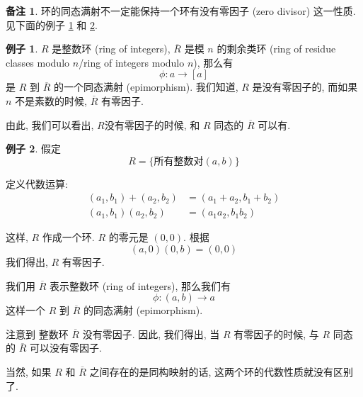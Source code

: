 \documentclass[utf8]{ctexbook}
\theoremstyle{definition}
\newtheorem{memo}{备注}[section]
\newtheorem{example}{例子}[section]
\begin{document}
\begin{memo}
环的同态满射不一定能保持一个环有没有零因子 (zero divisor) 这一性质. 见下面的例子 \ref{example_ring_epi_not_preserving_z_divisor_1} 和 \ref{example_ring_epi_not_preserving_z_divisor_2}.
\end{memo}

\begin{example}\label{example_ring_epi_not_preserving_z_divisor_1}
$R$ 是整数环 (ring of integers), $\overline{R}$ 是模 $n$ 的剩余类环 (ring of residue classes modulo $n$/ring of integers modulo $n$), 那么有
\begin{equation}
\phi: a \rightarrow [a]
\end{equation}
是 $R$ 到 $\overline{R}$ 的一个同态满射 (epimorphism). 我们知道, $R$ 是没有零因子的, 而如果 $n$ 不是素数的时候, $\overline{R}$ 有零因子.

由此, 我们可以看出, $R$没有零因子的时候, 和 $R$ 同态的 $\overline{R}$ 可以有.
\end{example}


\begin{example}\label{example_ring_epi_not_preserving_z_divisor_2}
假定
\begin{equation}
R = \{  \mbox{所有整数对} (a,b) \}
\end{equation}

定义代数运算:
\begin{align*}
 (a_1 , b_1 ) + (a_2, b_2) &= (a_1 + a_2, b_1 + b_2) \\
 (a_1, b_1) (a_2, b_2) &= (a_1 a_2, b_1 b_2)
\end{align*}

这样, $R$ 作成一个环. $R$ 的零元是 $(0,0)$. 根据
\begin{equation}
(a,0)(0,b) = (0,0)
\end{equation}
我们得出, $R$ 有零因子.


我们用 $\overline{R}$ 表示整数环 (ring of integers), 那么我们有
\begin{equation}
\phi: (a,b) \longrightarrow a
\end{equation}
这样一个 $R$ 到 $\overline{R}$ 的同态满射 (epimorphism). 

注意到 整数环 $\overline{R}$ 没有零因子. 因此, 我们得出, 当 $R$ 有零因子的时候, 与 $R$ 同态的 $\overline{R}$ 可以没有零因子.


\end{example}

当然, 如果 $R$ 和 $\overline{R}$ 之间存在的是同构映射的话, 这两个环的代数性质就没有区别了.
\end{document}
